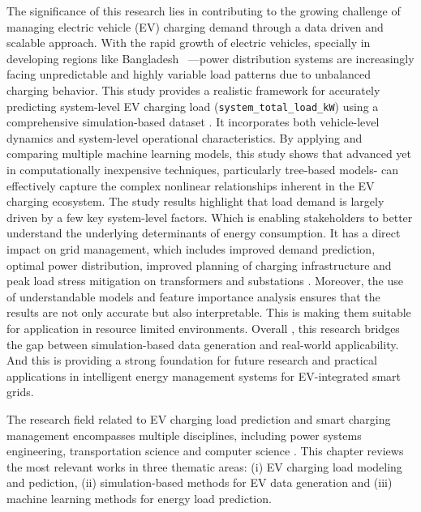 \documentclass{thesis-library}
\begin{document}
The significance of this research lies  in contributing to the growing challenge of managing electric vehicle (EV) charging demand through a data driven and scalable approach.  With the rapid growth of electric vehicles, specially in developing regions like Bangladesh~\cite{doley2024sustainability} —power distribution systems are increasingly facing unpredictable and highly variable load patterns due to unbalanced charging behavior.
This study provides a realistic framework for accurately predicting system-level EV charging load (\texttt{system\_total\_load\_kW}) using a comprehensive simulation-based dataset \cite{sumo2018}. It incorporates both vehicle-level dynamics and system-level operational characteristics.
By applying and comparing multiple machine learning models, this study shows that advanced yet in computationally inexpensive techniques, particularly tree-based models- can effectively capture the complex nonlinear relationships inherent in the EV charging ecosystem. The study results highlight that load demand is largely driven by a few key system-level factors. Which is enabling stakeholders to better understand the underlying determinants of energy consumption.
It has a direct impact on grid management, which includes improved demand prediction, optimal power distribution, improved planning of charging infrastructure and peak load stress mitigation on transformers and substations \cite{smart_charging2022}.
Moreover, the use of understandable models and feature importance analysis ensures that the results are not only accurate but also interpretable. This is making them suitable for application in resource limited environments. Overall , this research bridges the gap between simulation-based data generation and real-world applicability. And this is providing a strong foundation for future research and practical applications in intelligent energy management systems for EV-integrated smart grids.


The research field related to EV charging load prediction and smart charging management encompasses multiple disciplines, including power systems engineering, transportation science and computer science .
This chapter reviews the most relevant works in three thematic areas: (i) EV charging load modeling and pediction, (ii) simulation-based methods for EV data generation and (iii) machine learning methods for energy load prediction.
\end{document}

